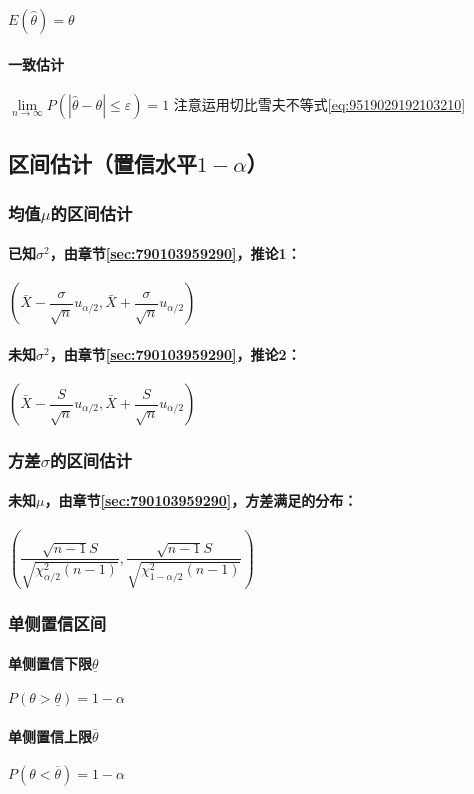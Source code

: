 $E(\hat{\theta})=\theta$

\paragraph{一致估计}

$\lim\limits_{n\rightarrow \infty} P \left(\left| \hat{\theta} - \theta \right| \leq \varepsilon \right)= 1$\hspace{1cm} 注意运用切比雪夫不等式\ref{eq:9519029192103210}

\subsection{区间估计（置信水平$1-\alpha$）}

\subsubsection{均值$\mu$的区间估计}


\paragraph{已知$\sigma^2$，由章节\ref{sec:790103959290}，推论1：}

$\left( \bar{X} - \dfrac{\sigma}{\sqrt{n}} u_{\alpha/2}, \bar{X} + \dfrac{\sigma}{\sqrt{n}} u_{\alpha/2} \right)$

\paragraph{未知$\sigma^2$，由章节\ref{sec:790103959290}，推论2：}

$\left( \bar{X} - \dfrac{S}{\sqrt{n}} u_{\alpha/2}, \bar{X} + \dfrac{S}{\sqrt{n}} u_{\alpha/2} \right)$

\subsubsection{方差$\sigma$的区间估计}

\paragraph{未知$\mu$，由章节\ref{sec:790103959290}，方差满足的分布：}

$\left( \dfrac{\sqrt{n-1}S}{\sqrt{\chi^{2}_{\alpha/2} (n-1)}},\dfrac{\sqrt{n-1}S}{\sqrt{\chi^{2}_{1-\alpha/2} (n-1)}} \right)$

\subsubsection{单侧置信区间}

\paragraph{单侧置信下限$\underline{\theta}$}

$P(\theta > \underline{\theta}) = 1 - \alpha$

\paragraph{单侧置信上限$\overline{\theta}$}

$P(\theta < \overline{\theta}) = 1 - \alpha$

